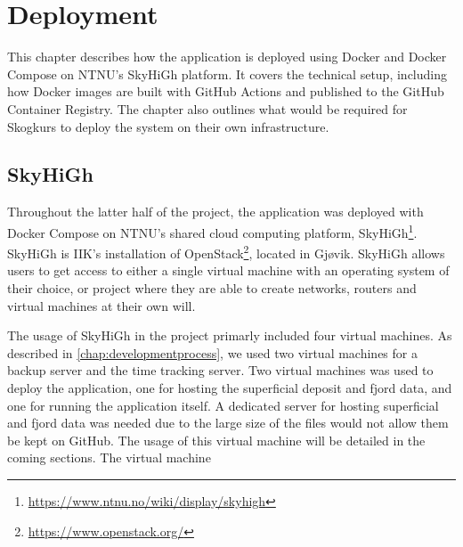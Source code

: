 \chapter{Deployment}\label{chap:deployment}

This chapter describes how the application is deployed using Docker and Docker Compose on NTNU's SkyHiGh platform. It covers the technical setup, including how Docker images are built with GitHub Actions and published to the GitHub Container Registry. The chapter also outlines what would be required for Skogkurs to deploy the system on their own infrastructure.

\section{SkyHiGh}

Throughout the latter half of the project, the application was deployed with Docker Compose on NTNU's shared cloud computing platform, SkyHiGh\footnote{\url{https://www.ntnu.no/wiki/display/skyhigh}}. SkyHiGh is IIK's installation of OpenStack\footnote{\url{https://www.openstack.org/}}, located in Gjøvik. SkyHiGh allows users to get access to either a single virtual machine with an operating system of their choice, or project where they are able to create networks, routers and virtual machines at their own will.

The usage of SkyHiGh in the project primarly included four virtual machines. As described in \autoref{chap:developmentprocess}, we used two virtual machines for a backup server and the time tracking server. Two virtual machines was used to deploy the application, one for hosting the superficial deposit and fjord data, and one for running the application itself. A dedicated server for hosting superficial and fjord data was needed due to the large size of the files would not allow them be kept on GitHub. The usage of this virtual machine will be detailed in the coming sections. The virtual machine


